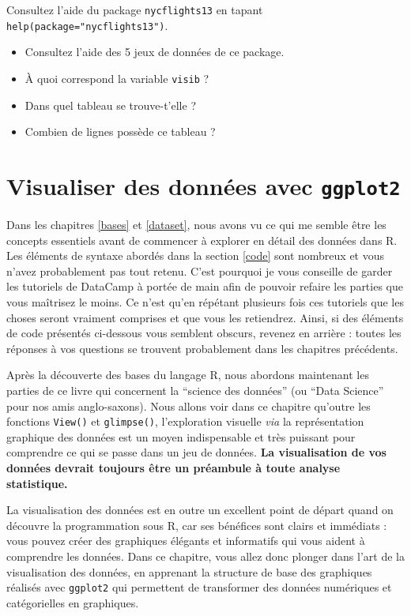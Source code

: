 \documentclass[a4paperpaper,]{article}
\providecommand{\tightlist}{%
  \setlength{\itemsep}{0pt}\setlength{\parskip}{0pt}}
\begin{document}
Consultez l'aide du package \texttt{nycflights13} en tapant \texttt{help(package="nycflights13")}.

\begin{itemize}
\tightlist
\item
  Consultez l'aide des 5 jeux de données de ce package.
\item
  À quoi correspond la variable \texttt{visib} ?
\item
  Dans quel tableau se trouve-t'elle ?
\item
  Combien de lignes possède ce tableau ?
\end{itemize}

\hypertarget{viz}{%
\section{\texorpdfstring{Visualiser des données avec \texttt{ggplot2}}{Visualiser des données avec ggplot2}}\label{viz}}

Dans les chapitres \ref{bases} et \ref{dataset}, nous avons vu ce qui me semble être les concepts essentiels avant de commencer à explorer en détail des données dans R. Les éléments de syntaxe abordés dans la section \ref{code} sont nombreux et vous n'avez probablement pas tout retenu. C'est pourquoi je vous conseille de garder les tutoriels de DataCamp à portée de main afin de pouvoir refaire les parties que vous maîtrisez le moins. Ce n'est qu'en répétant plusieurs fois ces tutoriels que les choses seront vraiment comprises et que vous les retiendrez. Ainsi, si des éléments de code présentés ci-dessous vous semblent obscurs, revenez en arrière : toutes les réponses à vos questions se trouvent probablement dans les chapitres précédents.

Après la découverte des bases du langage R, nous abordons maintenant les parties de ce livre qui concernent la ``science des données'' (ou ``Data Science'' pour nos amis anglo-saxons). Nous allons voir dans ce chapitre qu'outre les fonctions \texttt{View()} et \texttt{glimpse()}, l'exploration visuelle \emph{via} la représentation graphique des données est un moyen indispensable et très puissant pour comprendre ce qui se passe dans un jeu de données. \textbf{La visualisation de vos données devrait toujours être un préambule à toute analyse statistique.}

La visualisation des données est en outre un excellent point de départ quand on découvre la programmation sous R, car ses bénéfices sont clairs et immédiats : vous pouvez créer des graphiques élégants et informatifs qui vous aident à comprendre les données. Dans ce chapitre, vous allez donc plonger dans l'art de la visualisation des données, en apprenant la structure de base des graphiques réalisés avec \texttt{ggplot2} qui permettent de transformer des données numériques et catégorielles en graphiques.
\end{document}
